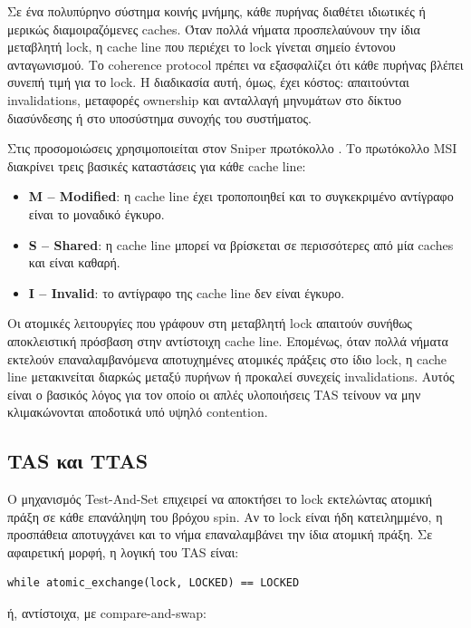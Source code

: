 \documentclass{article}
\newcommand{\code}[1]{\texttt{\detokenize{#1}}}
\providecommand{\textenglish}[1]{\foreignlanguage{english}{#1}}
\begin{document}
Σε ένα πολυπύρηνο σύστημα κοινής μνήμης, κάθε πυρήνας διαθέτει ιδιωτικές ή μερικώς διαμοιραζόμενες caches. Όταν πολλά νήματα προσπελαύνουν την ίδια μεταβλητή lock, η cache line που περιέχει το lock γίνεται σημείο έντονου ανταγωνισμού. Το coherence protocol πρέπει να εξασφαλίζει ότι κάθε πυρήνας βλέπει συνεπή τιμή για το lock. Η διαδικασία αυτή, όμως, έχει κόστος: απαιτούνται invalidations, μεταφορές ownership και ανταλλαγή μηνυμάτων στο δίκτυο διασύνδεσης ή στο υποσύστημα συνοχής του συστήματος.

Στις προσομοιώσεις χρησιμοποιείται στον Sniper πρωτόκολλο \code{parametric_dram_directory_msi}. Το πρωτόκολλο MSI διακρίνει τρεις βασικές καταστάσεις για κάθε cache line:

\begin{itemize}
\item \textbf{M -- Modified}: η cache line έχει τροποποιηθεί και το συγκεκριμένο αντίγραφο είναι το μοναδικό έγκυρο.
\item \textbf{S -- Shared}: η cache line μπορεί να βρίσκεται σε περισσότερες από μία caches και είναι καθαρή.
\item \textbf{I -- Invalid}: το αντίγραφο της cache line δεν είναι έγκυρο.
\end{itemize}

Οι ατομικές λειτουργίες που γράφουν στη μεταβλητή lock απαιτούν συνήθως αποκλειστική πρόσβαση στην αντίστοιχη cache line. Επομένως, όταν πολλά νήματα εκτελούν επαναλαμβανόμενα αποτυχημένες ατομικές πράξεις στο ίδιο lock, η cache line μετακινείται διαρκώς μεταξύ πυρήνων ή προκαλεί συνεχείς invalidations. Αυτός είναι ο βασικός λόγος για τον οποίο οι απλές υλοποιήσεις TAS τείνουν να μην κλιμακώνονται αποδοτικά υπό υψηλό contention.

\subsection{TAS και TTAS}

Ο μηχανισμός \textenglish{Test-And-Set} επιχειρεί να αποκτήσει το lock εκτελώντας ατομική πράξη σε κάθε επανάληψη του βρόχου spin. Αν το lock είναι ήδη κατειλημμένο, η προσπάθεια αποτυγχάνει και το νήμα επαναλαμβάνει την ίδια ατομική πράξη. Σε αφαιρετική μορφή, η λογική του TAS είναι:

\begin{verbatim}
while atomic_exchange(lock, LOCKED) == LOCKED
\end{verbatim}

ή, αντίστοιχα, με compare-and-swap:
\end{document}
